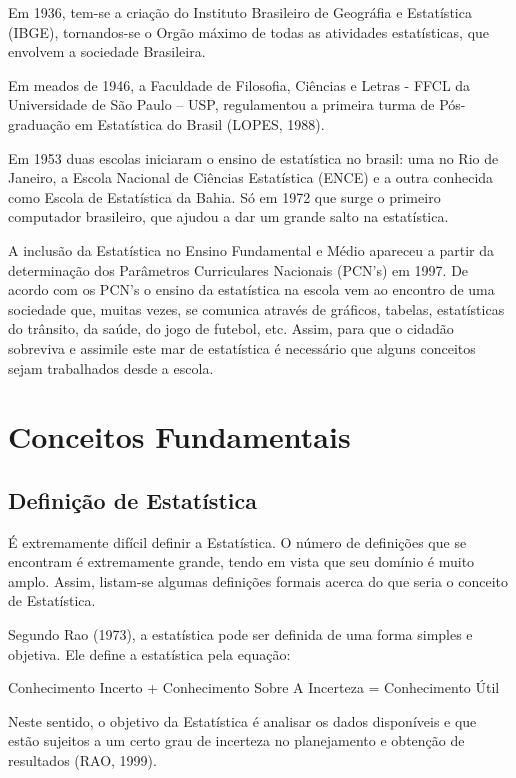 \inic Em 1936, tem-se a criação do Instituto Brasileiro de Geográfia e Estatística (IBGE), tornandos-se o Orgão máximo de todas as atividades estatísticas, que envolvem a sociedade Brasileira.\vskip0.3cm

\inic Em meados de 1946, a Faculdade de Filosofia, Ciências e Letras - FFCL da Universidade de São Paulo – USP, regulamentou a primeira turma de Pós-graduação em Estatística do Brasil (LOPES, 1988).\vskip0.3cm


\inic Em 1953 duas escolas iniciaram o ensino de estatística no brasil: uma no
Rio de Janeiro, a Escola Nacional de Ciências Estatística (ENCE) e
a outra conhecida como Escola de Estatística da Bahia. Só em 1972
que surge o primeiro computador brasileiro, que ajudou a dar um
grande salto na estatística.\vskip0.3cm


\inic A inclusão da Estatística no Ensino Fundamental e Médio apareceu a
partir da determinação dos Parâmetros Curriculares Nacionais
(PCN's) em 1997. De acordo com os PCN's o ensino da estatística na
escola vem ao encontro de uma sociedade que, muitas vezes, se
comunica através de gráficos, tabelas, estatísticas do trânsito,
da saúde, do jogo de futebol, etc. Assim, para que o cidadão
sobreviva e assimile este mar de estatística é necessário que
alguns conceitos sejam trabalhados desde a escola.


\section{Conceitos Fundamentais}

\subsection{Definição de Estatística}

\inic É extremamente difícil definir a Estatística. O número de definições
que se encontram é extremamente grande, tendo em vista que seu domínio é
muito amplo. Assim, listam-se algumas definições formais acerca do que
seria o conceito de Estatística.\vskip0.3cm

Segundo Rao (1973), a estatística pode ser definida de uma forma
simples e objetiva. Ele define a estatística pela equação:

\begin{center}
Conhecimento Incerto + Conhecimento Sobre A Incerteza =
 Conhecimento Útil
\end{center}

Neste sentido, o objetivo da Estatística é analisar os dados
disponíveis e que estão sujeitos a um certo grau de incerteza no
planejamento e obtenção de resultados (RAO, 1999).\vskip0.3cm


